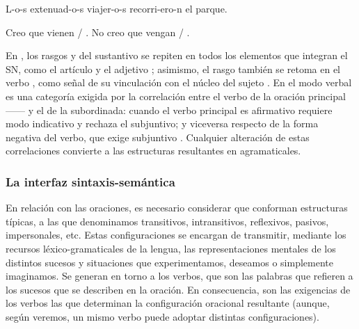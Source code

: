\begin{exe}
  \ex\label{ex:01-concordancia}
    \begin{xlist}
      \ex L-o-s extenuad-o-s viajer-o-s recorri-ero-n el parque.
    \end{xlist}
  \ex\label{ex:01-modo}
    \begin{xlist}
      \ex\label{ex:01-modo-a} Creo que vienen / .
      \ex\label{ex:01-modo-b} No creo que vengan / .
    \end{xlist}
\end{exe}

En , los rasgos  y  del
sustantivo  se repiten en todos los elementos que integran el
SN, como el artículo  y el adjetivo ;
asimismo, el rasgo  también se retoma en el verbo
, como señal de su vinculación con el núcleo del sujeto
. En
 el modo verbal es una categoría exigida por la correlación
entre el verbo de la oración principal ------ y el de la
subordinada: cuando el verbo principal es afirmativo requiere modo indicativo
  y rechaza el subjuntivo; y viceversa
respecto de la forma negativa del verbo, que exige subjuntivo 
. Cualquier alteración de estas correlaciones convierte a
las estructuras resultantes en agramaticales.

\subsubsection{La interfaz sintaxis-semántica}

En relación con las oraciones, es necesario considerar que conforman
estructuras típicas, a las que denominamos 
transitivos, intransitivos, reflexivos, pasivos, impersonales, etc. Estas
configuraciones se encargan de transmitir, mediante los recursos
léxico-gramaticales de la lengua, las representaciones mentales de los
distintos sucesos y situaciones que experimentamos, deseamos o simplemente
imaginamos. Se generan en torno a los verbos, que son las palabras que refieren
a los sucesos que se describen en la oración. En consecuencia, son las
exigencias de los verbos las que determinan la configuración oracional
resultante (aunque, según veremos, un mismo verbo puede adoptar distintas
configuraciones).

